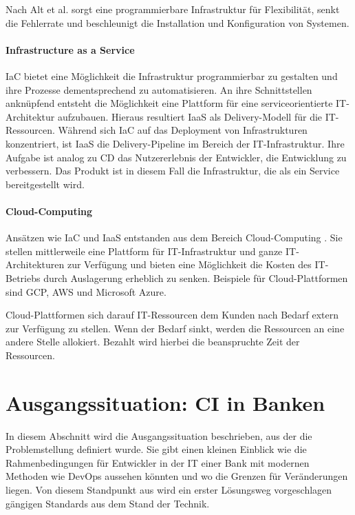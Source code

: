 Nach Alt et al. \cite{Alt2017} sorgt eine programmierbare Infrastruktur für Flexibilität, senkt die Fehlerrate und beschleunigt die Installation und Konfiguration von Systemen.

\paragraph{Infrastructure as a Service}
\ac{IaC} bietet eine Möglichkeit die Infrastruktur programmierbar zu gestalten und ihre Prozesse dementsprechend zu automatisieren. An ihre Schnittstellen anknüpfend entsteht die Möglichkeit eine Plattform für eine serviceorientierte IT-Architektur aufzubauen. Hieraus resultiert \ac{IaaS} als Delivery-Modell \cite{Alt2017} für die IT-Ressourcen. Während sich \ac{IaC} auf das Deployment von Infrastrukturen konzentriert, ist \ac{IaaS} die Delivery-Pipeline im Bereich der IT-Infrastruktur. Ihre Aufgabe ist analog zu \ac{CD} das Nutzererlebnis der Entwickler, die Entwicklung zu verbessern. Das Produkt ist in diesem Fall die Infrastruktur, die als ein Service bereitgestellt wird.

\paragraph{Cloud-Computing}
Ansätzen wie \ac{IaC} und \ac{IaaS} entstanden aus dem Bereich Cloud-Computing \cite{Alt2017}. Sie stellen mittlerweile eine Plattform für IT-Infrastruktur und ganze IT-Architekturen zur Verfügung und bieten eine Möglichkeit die Kosten des IT-Betriebs durch Auslagerung erheblich zu senken. Beispiele für Cloud-Plattformen sind \ac{GCP}, \ac{AWS} und Microsoft Azure.

Cloud-Plattformen sich darauf IT-Ressourcen dem Kunden nach Bedarf extern zur Verfügung zu stellen. Wenn der Bedarf sinkt, werden die Ressourcen an eine andere Stelle allokiert. Bezahlt wird hierbei die beanspruchte Zeit der Ressourcen. 

\section{Ausgangssituation: CI in Banken}
\label{grundlagen:ci-in-banken}
In diesem Abschnitt wird die Ausgangssituation beschrieben, aus der die Problemstellung definiert wurde. Sie gibt einen kleinen Einblick wie die Rahmenbedingungen für Entwickler in der IT einer Bank mit modernen Methoden wie DevOps aussehen könnten und wo die Grenzen für Veränderungen liegen. Von diesem Standpunkt aus wird ein erster Lösungsweg vorgeschlagen gängigen Standards aus dem Stand der Technik. 
%
